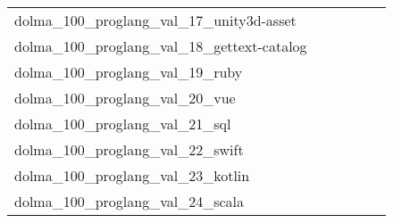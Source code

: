 {\begin{longtable}{m{6cm}m{1.7cm}m{1.7cm}m{1.7cm}m{1.7cm}m{1.7cm}}
	dolma\_100\_proglang\_val\_17\_unity3d-asset  & \colorbox[HTML]{77c578}{\makebox[\mywidth][c]{4.01}} & \colorbox[HTML]{f9fcc6}{\makebox[\mywidth][c]{4.17}} & \colorbox[HTML]{ffffe5}{\makebox[\mywidth][c]{4.56}} & \colorbox[HTML]{e4f4ab}{\makebox[\mywidth][c]{4.10}} & \colorbox[HTML]{bbe395}{\makebox[\mywidth][c]{4.05}}\\
	dolma\_100\_proglang\_val\_18\_gettext-catalog  & \colorbox[HTML]{86cc7e}{\makebox[\mywidth][c]{2.84}} & \colorbox[HTML]{afdd8f}{\makebox[\mywidth][c]{2.87}} & \colorbox[HTML]{ffffe5}{\makebox[\mywidth][c]{3.53}} & \colorbox[HTML]{9dd687}{\makebox[\mywidth][c]{2.86}} & \colorbox[HTML]{77c578}{\makebox[\mywidth][c]{2.83}}\\
	dolma\_100\_proglang\_val\_19\_ruby  & \colorbox[HTML]{c8e89a}{\makebox[\mywidth][c]{2.41}} & \colorbox[HTML]{e8f6ae}{\makebox[\mywidth][c]{2.44}} & \colorbox[HTML]{ffffe5}{\makebox[\mywidth][c]{2.70}} & \colorbox[HTML]{9bd587}{\makebox[\mywidth][c]{2.39}} & \colorbox[HTML]{77c578}{\makebox[\mywidth][c]{2.38}}\\
	dolma\_100\_proglang\_val\_20\_vue  & \colorbox[HTML]{d3eda0}{\makebox[\mywidth][c]{1.95}} & \colorbox[HTML]{e3f4aa}{\makebox[\mywidth][c]{1.95}} & \colorbox[HTML]{ffffe5}{\makebox[\mywidth][c]{2.10}} & \colorbox[HTML]{b7e193}{\makebox[\mywidth][c]{1.94}} & \colorbox[HTML]{77c578}{\makebox[\mywidth][c]{1.93}}\\
	dolma\_100\_proglang\_val\_21\_sql  & \colorbox[HTML]{c3e698}{\makebox[\mywidth][c]{2.18}} & \colorbox[HTML]{f7fcbc}{\makebox[\mywidth][c]{2.23}} & \colorbox[HTML]{ffffe5}{\makebox[\mywidth][c]{2.46}} & \colorbox[HTML]{addd8e}{\makebox[\mywidth][c]{2.17}} & \colorbox[HTML]{77c578}{\makebox[\mywidth][c]{2.16}}\\
	dolma\_100\_proglang\_val\_22\_swift  & \colorbox[HTML]{ceeb9e}{\makebox[\mywidth][c]{1.86}} & \colorbox[HTML]{ebf7b0}{\makebox[\mywidth][c]{1.88}} & \colorbox[HTML]{ffffe5}{\makebox[\mywidth][c]{2.04}} & \colorbox[HTML]{bfe596}{\makebox[\mywidth][c]{1.86}} & \colorbox[HTML]{77c578}{\makebox[\mywidth][c]{1.84}}\\
	dolma\_100\_proglang\_val\_23\_kotlin  & \colorbox[HTML]{98d485}{\makebox[\mywidth][c]{2.05}} & \colorbox[HTML]{daf0a4}{\makebox[\mywidth][c]{2.07}} & \colorbox[HTML]{ffffe5}{\makebox[\mywidth][c]{2.29}} & \colorbox[HTML]{d4eea0}{\makebox[\mywidth][c]{2.07}} & \colorbox[HTML]{77c578}{\makebox[\mywidth][c]{2.04}}\\
	dolma\_100\_proglang\_val\_24\_scala  & \colorbox[HTML]{84cb7d}{\makebox[\mywidth][c]{2.24}} & \colorbox[HTML]{d5eea1}{\makebox[\mywidth][c]{2.28}} & \colorbox[HTML]{ffffe5}{\makebox[\mywidth][c]{2.64}} & \colorbox[HTML]{a5d98b}{\makebox[\mywidth][c]{2.25}} & \colorbox[HTML]{77c578}{\makebox[\mywidth][c]{2.23}}\\

\end{longtable}}
